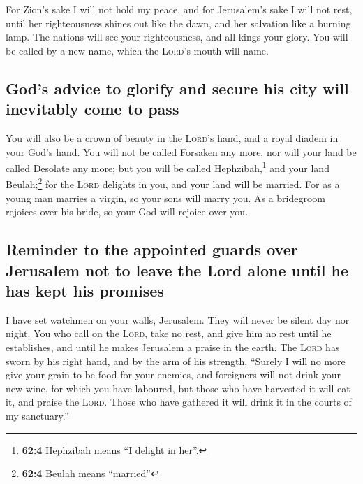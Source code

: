  For Zion's sake I will not hold my peace, and for
Jerusalem's sake I will not rest, until her righteousness shines out
like the dawn, and her salvation like a burning lamp.  The
nations will see your righteousness, and all kings your glory. You will
be called by a new name, which the \textsc{Lord}'s mouth will name.

\hypertarget{gods-advice-to-glorify-and-secure-his-city-will-inevitably-come-to-pass}{%
\subsection{God's advice to glorify and secure his city will inevitably
come to
pass}\label{gods-advice-to-glorify-and-secure-his-city-will-inevitably-come-to-pass}}

 You will also be a crown of beauty in the \textsc{Lord}'s
hand, and a royal diadem in your God's hand.  You will not
be called Forsaken any more, nor will your land be called Desolate any
more; but you will be called Hephzibah,\footnote{\textbf{62:4} Hephzibah
  means ``I delight in her''.} and your land Beulah;\footnote{\textbf{62:4}
  Beulah means ``married''} for the \textsc{Lord} delights in you, and
your land will be married.  For as a young man marries a
virgin, so your sons will marry you. As a bridegroom rejoices over his
bride, so your God will rejoice over you.

\hypertarget{reminder-to-the-appointed-guards-over-jerusalem-not-to-leave-the-lord-alone-until-he-has-kept-his-promises}{%
\subsection{Reminder to the appointed guards over Jerusalem not to leave
the Lord alone until he has kept his
promises}\label{reminder-to-the-appointed-guards-over-jerusalem-not-to-leave-the-lord-alone-until-he-has-kept-his-promises}}

 I have set watchmen on your walls, Jerusalem. They will
never be silent day nor night. You who call on the \textsc{Lord}, take
no rest,  and give him no rest until he establishes, and
until he makes Jerusalem a praise in the earth.  The
\textsc{Lord} has sworn by his right hand, and by the arm of his
strength, ``Surely I will no more give your grain to be food for your
enemies, and foreigners will not drink your new wine, for which you have
laboured,  but those who have harvested it will eat it,
and praise the \textsc{Lord}. Those who have gathered it will drink it
in the courts of my sanctuary.''

